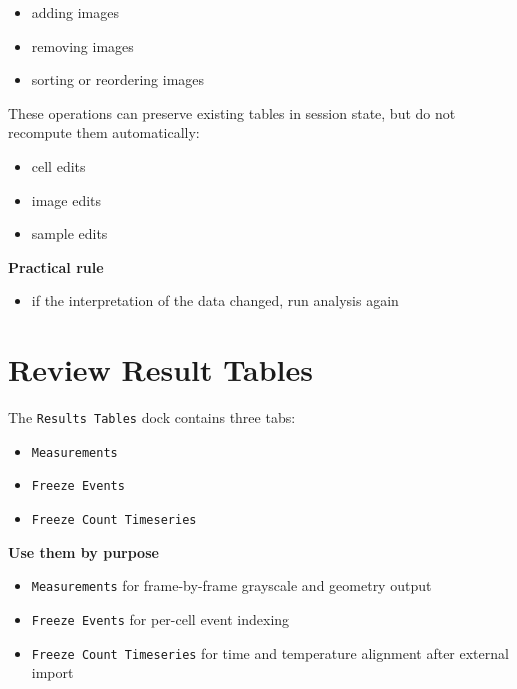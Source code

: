 \documentclass[
  9pt,
  letterpaper,
  oneside,
  open=any,
  DIV=15,
  parskip=half-,
  headings=big,
  numbers=noenddot
]{scrbook}
\newcommand{\manuallead}[1]{%
  \vspace{0.15em}%
  {\sffamily\bfseries\color{ManualBlue}#1}\par\nobreak\vspace{0.05em}%
}
\begin{document}
\begin{itemize}[leftmargin=*,itemsep=0.35em,topsep=0.4em]
\item adding images
\item removing images
\item sorting or reordering images
\end{itemize}

These operations can preserve existing tables in session state, but do not recompute them automatically:


\begin{itemize}[leftmargin=*,itemsep=0.35em,topsep=0.4em]
\item cell edits
\item image edits
\item sample edits
\end{itemize}

\manuallead{Practical rule}

\begin{itemize}[leftmargin=*,itemsep=0.35em,topsep=0.4em]
\item if the interpretation of the data changed, run analysis again
\end{itemize}

\section{Review Result Tables}

The \texttt{Results Tables} dock contains three tabs:


\begin{itemize}[leftmargin=*,itemsep=0.35em,topsep=0.4em]
\item \texttt{Measurements}
\item \texttt{Freeze Events}
\item \texttt{Freeze Count Timeseries}
\end{itemize}

\manuallead{Use them by purpose}

\begin{itemize}[leftmargin=*,itemsep=0.35em,topsep=0.4em]
\item \texttt{Measurements} for frame-by-frame grayscale and geometry output
\item \texttt{Freeze Events} for per-cell event indexing
\item \texttt{Freeze Count Timeseries} for time and temperature alignment after external import
\end{itemize}
\end{document}
